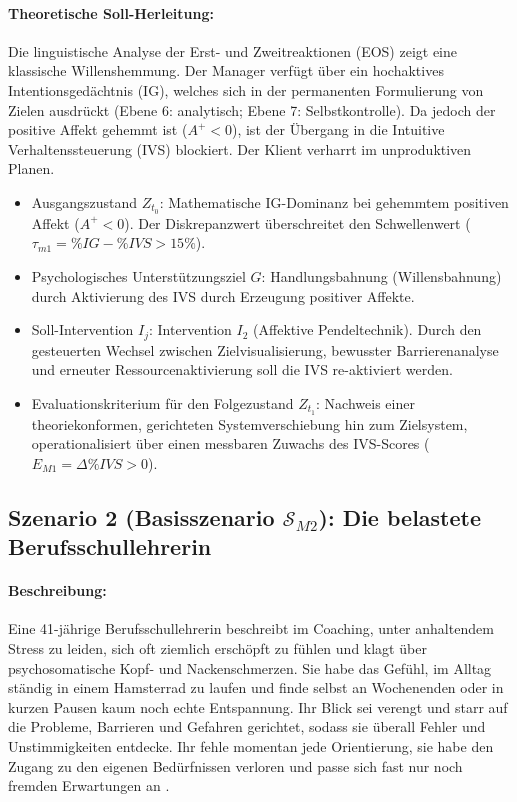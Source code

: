 \paragraph{Theoretische Soll-Herleitung:} 
Die linguistische Analyse der Erst- und Zweitreaktionen (EOS) zeigt eine klassische Willenshemmung. Der Manager verfügt über ein hochaktives Intentionsgedächtnis (IG), welches sich in der permanenten Formulierung von Zielen ausdrückt (Ebene 6: analytisch; Ebene 7: Selbstkontrolle). Da jedoch der positive Affekt gehemmt ist ($A^+ < 0$), ist der Übergang in die Intuitive Verhaltenssteuerung (IVS) blockiert. Der Klient verharrt im unproduktiven Planen.
\begin{itemize}
    \item Ausgangszustand $Z_{t_0}$: Mathematische IG-Dominanz bei gehemmtem positiven Affekt ($A^+ < 0$). Der Diskrepanzwert überschreitet den Schwellenwert ($\tau_{m1} = \%IG - \%IVS > 15\%$).
    \item Psychologisches Unterstützungsziel $G$: Handlungsbahnung (Willensbahnung) durch Aktivierung des IVS durch Erzeugung positiver Affekte.
    \item Soll-Intervention $I_j$: Intervention $I_2$ (Affektive Pendeltechnik). Durch den gesteuerten Wechsel zwischen Zielvisualisierung, bewusster Barrierenanalyse und erneuter Ressourcenaktivierung soll die IVS re-aktiviert werden.
    \item Evaluationskriterium für den Folgezustand $Z_{t_1}$: Nachweis einer theoriekonformen, gerichteten Systemverschiebung hin zum Zielsystem, operationalisiert über einen messbaren Zuwachs des IVS-Scores ($E_{M1} = \Delta\%IVS > 0$).
\end{itemize}

\subsection{Szenario 2 (Basisszenario $\mathcal{S}_{M2}$): Die belastete Berufsschullehrerin}
\paragraph{Beschreibung:} Eine 41-jährige Berufsschullehrerin beschreibt im Coaching, unter anhaltendem Stress zu leiden, sich oft ziemlich erschöpft zu fühlen und klagt über psychosomatische Kopf- und Nackenschmerzen. Sie habe das Gefühl, im Alltag ständig in einem Hamsterrad zu laufen und finde selbst an Wochenenden oder in kurzen Pausen kaum noch echte Entspannung. Ihr Blick sei verengt und starr auf die Probleme, Barrieren und Gefahren gerichtet, sodass sie überall Fehler und Unstimmigkeiten entdecke. Ihr fehle momentan jede Orientierung, sie habe den Zugang zu den eigenen Bedürfnissen verloren und passe sich fast nur noch fremden Erwartungen an \citep{kuhl2014psi}.

